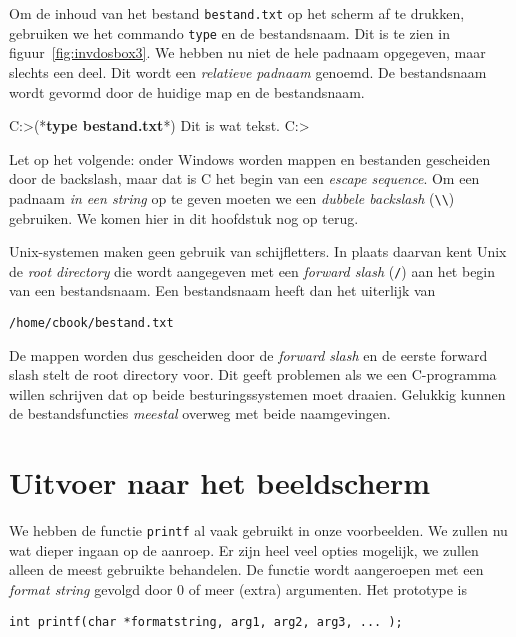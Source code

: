 Om de inhoud van het bestand \texttt{bestand.txt} op het scherm af te drukken, gebruiken we het commando \texttt{type} en de bestandsnaam. Dit is te zien in figuur~\ref{fig:invdosbox3}. We hebben nu niet de hele padnaam opgegeven, maar slechts een deel. Dit wordt een \textsl{relatieve padnaam} genoemd. De bestandsnaam wordt gevormd door de huidige map en de bestandsnaam.

\begin{dosbox}[title=Afdrukken van een bestand.,label=fig:invdosbox3]
C:\Users\Cbook>(*\textbf{type bestand.txt}*)
Dit is wat tekst.
C:\Users\Cbook>
\end{dosbox}

Let op het volgende: onder Windows worden mappen en bestanden gescheiden door de backslash, maar dat is C het begin van een \textsl{escape sequence}. Om een padnaam  \textsl{in een string} op te geven moeten we een \textsl{dubbele backslash} (\texttt{\textbackslash\textbackslash}) gebruiken. We komen hier in dit hoofdstuk nog op terug.
 
Unix-systemen maken geen gebruik van schijfletters. In plaats daarvan kent Unix de \textsl{root directory} die wordt aangegeven met een \textsl{forward slash} (\texttt{/}) aan het begin van een bestandsnaam. Een bestandsnaam heeft dan het uiterlijk van

\begin{lstlisting}[style=lstoneline]
/home/cbook/bestand.txt
\end{lstlisting}

De mappen worden dus gescheiden door de \textsl{forward slash} en de eerste forward slash stelt de root directory voor. Dit geeft problemen als we een C-programma willen schrijven dat op beide besturingssystemen moet draaien. Gelukkig kunnen de bestandsfuncties \textsl{meestal} overweg met beide naamgevingen.


\section{Uitvoer naar het beeldscherm}
\label{sec:iouitvoernaarbeeldscherm}
We hebben de functie \texttt{printf} al vaak gebruikt in onze voorbeelden. We zullen nu wat dieper ingaan op de aanroep. Er zijn heel veel opties mogelijk, we zullen alleen de meest gebruikte behandelen. De functie wordt aangeroepen met een \textsl{format string} gevolgd door 0 of meer (extra) argumenten. Het prototype is

\begin{lstlisting}[style=lstoneline]
int printf(char *formatstring, arg1, arg2, arg3, ... );
\end{lstlisting}


